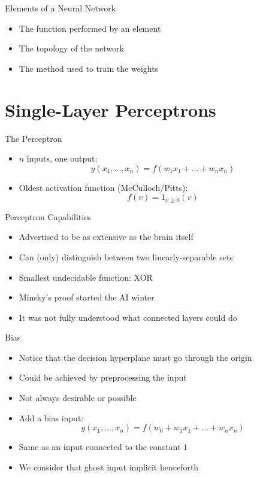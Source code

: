 \documentclass[size=14pt,
  style=tycja,
  paper=screen,
  ]{powerdot}
\begin{document}
\begin{slide}{Elements of a Neural Network}
  \begin{itemize}
  \item The function performed by an element
  \item The topology of the network
  \item The method used to train the weights
  \end{itemize}
\end{slide}

\section{Single-Layer Perceptrons}

\begin{slide}{The Perceptron}
  \begin{itemize}
  \item $n$ inputs, one output:\\
  \begin{equation}
    y(x_1,\ldots,x_n) = f(w_1x_1 + \ldots + w_nx_n)
  \end{equation}
  \item Oldest activation function (McCulloch/Pitts):\\
  \begin{equation}
    f(v) = 1_{x \geq 0}(v)
  \end{equation}
  \end{itemize}
\end{slide}

\begin{slide}{Perceptron Capabilities}
  \begin{itemize}
  \item Advertised to be as extensive as the brain itself
  \item Can (only) distinguish between two linearly-separable sets
  \item Smallest undecidable function: XOR 
  \item Minsky's proof started the AI winter
  \item It was not fully understood what connected layers could do
  \end{itemize}
\end{slide}

\begin{slide}{Bias}
  \begin{itemize}
  \item Notice that the decision hyperplane must go through the origin
  \item Could be achieved by preprocessing the input
  \item Not always desirable or possible
  \item Add a bias input:
  \begin{equation}
    y(x_1,\ldots,x_n) = f(w_0 + w_1x_1 + \ldots + w_nx_n)
  \end{equation}
  \item Same as an input connected to the constant $1$
  \item We consider that ghost input implicit henceforth
  \end{itemize}
\end{slide}
\end{document}
